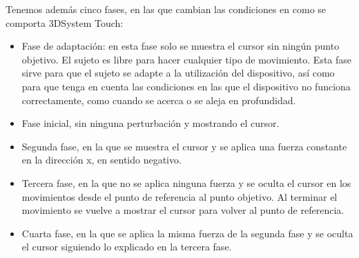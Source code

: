 \documentclass[a4paper,11pt, oneside]{book}
\begin{document}
Tenemos además cinco fases, en las que cambian las condiciones en como se comporta 3DSystem Touch:

\begin{itemize}
	\item Fase de adaptación: en esta fase solo se muestra el cursor sin ningún punto objetivo. El sujeto es libre para hacer cualquier tipo de movimiento. Esta fase sirve para que el sujeto se adapte a la utilización del dispositivo, así como para que tenga en cuenta las condiciones en las que el dispositivo no funciona correctamente, como cuando se acerca o se aleja en profundidad.
	\item Fase inicial, sin ninguna perturbación y mostrando el cursor.
	\item Segunda fase, en la que se muestra el cursor y se aplica una fuerza constante en la dirección x, en sentido negativo.
	\item Tercera fase, en la que no se aplica ninguna fuerza y se oculta el cursor en los movimientos desde el punto de referencia al punto objetivo. Al terminar el movimiento se vuelve a mostrar el cursor para volver al punto de referencia.
	\item Cuarta fase, en la que se aplica la misma fuerza de la segunda fase y se oculta el cursor siguiendo lo explicado en la tercera fase.
\end{itemize}
\end{document}
